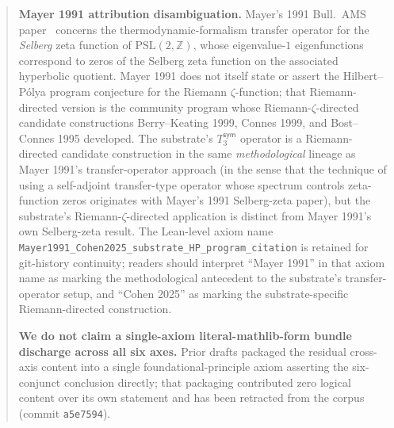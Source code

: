 \documentclass[11pt,a4paper]{amsart}
\theoremstyle{plain}
\theoremstyle{definition}
\begin{document}
\begin{abstract}
\noindent\textbf{Mayer 1991 attribution disambiguation.} Mayer's 1991 Bull.~AMS paper~\cite{mayer1991} concerns the thermodynamic-formalism transfer operator for the \emph{Selberg} zeta function of $\mathrm{PSL}(2,\mathbb{Z})$, whose eigenvalue-$1$ eigenfunctions correspond to zeros of the Selberg zeta function on the associated hyperbolic quotient. Mayer 1991 does not itself state or assert the Hilbert--P\'olya program conjecture for the Riemann $\zeta$-function; that Riemann-directed version is the community program whose Riemann-$\zeta$-directed candidate constructions Berry--Keating 1999, Connes 1999, and Bost--Connes 1995 developed. The substrate's $T_3^{\textsf{sym}}$ operator is a Riemann-directed candidate construction in the same \emph{methodological} lineage as Mayer 1991's transfer-operator approach (in the sense that the technique of using a self-adjoint transfer-type operator whose spectrum controls zeta-function zeros originates with Mayer's 1991 Selberg-zeta paper), but the substrate's Riemann-$\zeta$-directed application is distinct from Mayer 1991's own Selberg-zeta result. The Lean-level axiom name \texttt{Mayer1991\_Cohen2025\_substrate\_HP\_program\_citation} is retained for git-history continuity; readers should interpret ``Mayer 1991'' in that axiom name as marking the methodological antecedent to the substrate's transfer-operator setup, and ``Cohen 2025'' as marking the substrate-specific Riemann-directed construction.

\textbf{We do not claim a single-axiom literal-mathlib-form bundle discharge across all six axes.} Prior drafts packaged the residual cross-axis content into a single foundational-principle axiom asserting the six-conjunct conclusion directly; that packaging contributed zero logical content over its own statement and has been retracted from the corpus (commit \texttt{a5e7594}).


\end{abstract}
\end{document}
